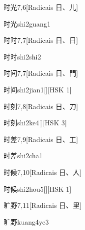 \begin{entry}{时光}{7,6}[Radicais ⽇、⼉]
  \begin{phonetics}{时光}{shi2guang1}
  \end{phonetics}
\end{entry}

\begin{entry}{时时}{7,7}[Radicais ⽇、⽇]
  \begin{phonetics}{时时}{shi2shi2}
  \end{phonetics}
\end{entry}

\begin{entry}{时间}{7,7}[Radicais ⽇、⾨]
  \begin{phonetics}{时间}{shi2jian1}[][HSK 1]
  \end{phonetics}
\end{entry}

\begin{entry}{时刻}{7,8}[Radicais ⽇、⼑]
  \begin{phonetics}{时刻}{shi2ke4}[][HSK 3]
  \end{phonetics}
\end{entry}

\begin{entry}{时差}{7,9}[Radicais ⽇、⼯]
  \begin{phonetics}{时差}{shi2cha1}
  \end{phonetics}
\end{entry}

\begin{entry}{时候}{7,10}[Radicais ⽇、⼈]
  \begin{phonetics}{时候}{shi2hou5}[][HSK 1]
  \end{phonetics}
\end{entry}

\begin{entry}{旷野}{7,11}[Radicais ⽇、⾥]
  \begin{phonetics}{旷野}{kuang4ye3}
  \end{phonetics}
\end{entry}

